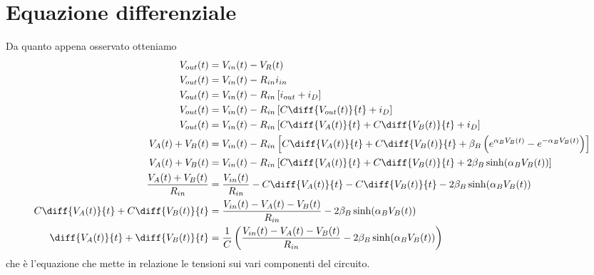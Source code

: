 	\section{Equazione differenziale}
		Da quanto appena osservato otteniamo
		\begin{equation}
			\label{eq:differenziale}
			\begin{split}
				V_{out}(t) &= V_{in}(t)-V_{R}(t)\\
				V_{out}(t) &= V_{in}(t)-R_{in}i_{in}\\
				V_{out}(t) &= V_{in}(t)-R_{in}\left[i_{out}+i_{D}\right]\\
				V_{out}(t) &= V_{in}(t)-R_{in}\left[C\diff{V_{out}(t)}{t}+i_{D}\right]\\
				V_{out}(t) &= V_{in}(t)-R_{in}\left[C\diff{V_{A}(t)}{t}+C\diff{V_{B}(t)}{t}+i_{D}\right]\\
				V_{A}(t)+V_{B}(t) &= V_{in}(t)-R_{in}\left[C\diff{V_{A}(t)}{t}+C\diff{V_{B}(t)}{t}+\beta_{B}\left(e^{\alpha_{B}V_{B}(t)}-e^{-\alpha_{B}V_{B}(t)}\right)\right]\\
				V_{A}(t)+V_{B}(t) &= V_{in}(t)-R_{in}\left[C\diff{V_{A}(t)}{t}+C\diff{V_{B}(t)}{t}+2\beta_{B}\sinh(\alpha_{B}V_{B}(t))\right]\\
				\frac{V_{A}(t)+V_{B}(t)}{R_{in}} &= \frac{V_{in}(t)}{R_{in}}-C\diff{V_{A}(t)}{t}-C\diff{V_{B}(t)}{t}-2\beta_{B}\sinh(\alpha_{B}V_{B}(t))\\
				C\diff{V_{A}(t)}{t}+C\diff{V_{B}(t)}{t} &= \frac{V_{in}(t)-V_{A}(t)-V_{B}(t)}{R_{in}}-2\beta_{B}\sinh(\alpha_{B}V_{B}(t))\\
				\diff{V_{A}(t)}{t}+\diff{V_{B}(t)}{t} &= \frac{1}{C}\left(\frac{V_{in}(t)-V_{A}(t)-V_{B}(t)}{R_{in}}-2\beta_{B}\sinh(\alpha_{B}V_{B}(t))\right)\\
			\end{split}
		\end{equation}
		che è l'equazione che mette in relazione le tensioni sui vari componenti del circuito.
		\pagebreak
		
